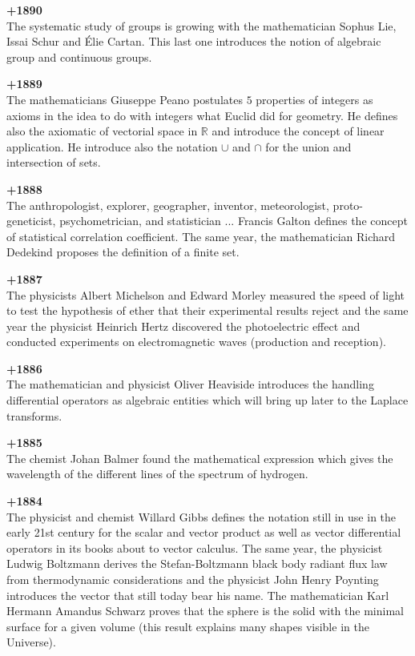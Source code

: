\textbf{+1890}\\
The systematic study of groups is growing with the mathematician Sophus Lie, Issai Schur and Élie Cartan. This last one introduces the notion of algebraic group and continuous groups. 

\textbf{+1889}\\
The mathematicians Giuseppe Peano postulates $5$ properties of integers as axioms in the idea to do with integers what Euclid did for geometry. He defines also the axiomatic of vectorial space in $\mathbb{R}$ and introduce the concept of linear application. He introduce also the notation $\cup$ and $\cap$ for the union and intersection of sets.

\textbf{+1888}\\
The anthropologist, explorer, geographer, inventor, meteorologist, proto-geneticist, psychometrician, and statistician ... Francis Galton defines the concept of statistical correlation coefficient. The same year, the mathematician Richard Dedekind proposes the definition of a finite set. 

\textbf{+1887}\\
The physicists Albert Michelson and Edward Morley measured the speed of light to test the hypothesis of ether that their experimental results reject and the same year the physicist Heinrich Hertz discovered the photoelectric effect and conducted experiments on electromagnetic waves (production and reception).

\textbf{+1886}\\
The mathematician and physicist Oliver Heaviside introduces the handling differential operators as algebraic entities which will bring up later to the Laplace transforms.

\textbf{+1885}\\
The chemist Johan Balmer found the mathematical expression which gives the wavelength of the different lines of the spectrum of hydrogen.

\textbf{+1884}\\
The physicist and chemist Willard Gibbs defines the notation still in use in the early 21st century for the scalar and vector product as well as vector differential operators in its books about to vector calculus. The same year, the physicist Ludwig Boltzmann derives the Stefan-Boltzmann black body radiant flux law from thermodynamic considerations and the physicist John Henry Poynting introduces the vector that still today bear his name. The mathematician Karl Hermann Amandus Schwarz proves that the sphere is the solid with the minimal surface for a given volume (this result explains many shapes visible in the Universe).

